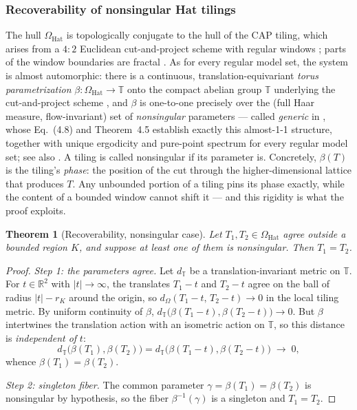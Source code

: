 \documentclass[a4paper,unpublished]{quantumarticle}
\newtheorem{theorem}{Theorem}
\theoremstyle{remark}
\newcommand{\OHat}{\Omega_{\mathrm{Hat}}}
\newcommand{\RR}{\mathbb{R}}
\begin{document}
\subsubsection{Recoverability of nonsingular Hat tilings}

The hull $\OHat$ is topologically conjugate to the hull of the CAP
tiling, which arises from a $4{:}2$ Euclidean cut-and-project scheme
with regular windows \cite{BGS2025}; parts of the window boundaries
are fractal \cite[Fig.~10]{BGMM2025}. As for every regular model
set, the system is almost automorphic: there is a continuous,
translation-equivariant \emph{torus parametrization}
$\beta : \OHat \to \mathbb{T}$ onto the compact abelian group
$\mathbb{T}$ underlying the cut-and-project scheme
\cite[Def.~4.2 and Prop.~4.3]{Schlottmann}, and $\beta$ is
one-to-one precisely over the (full Haar measure, flow-invariant) set
of \emph{nonsingular} parameters --- called \emph{generic} in
\cite{Schlottmann}, whose Eq.~(4.8) and Theorem~4.5 establish
exactly this almost-1-1 structure, together with unique ergodicity
and pure-point spectrum for every regular model set; see also
\cite[Ch.~7]{BaakeGrimm}. A tiling is called nonsingular if its
parameter is. Concretely, $\beta(T)$ is the tiling's
\emph{phase}: the position of the cut through the higher-dimensional
lattice that produces $T$. Any unbounded portion of a tiling pins its
phase exactly, while the content of a bounded window cannot shift it
--- and this rigidity is what the proof exploits.

\begin{theorem}[Recoverability, nonsingular case]
\label{thm:recover}
Let $T_{1}, T_{2} \in \OHat$ agree outside a bounded region $K$, and
suppose at least one of them is nonsingular. Then $T_{1} = T_{2}$.
\end{theorem}

\begin{proof}
\emph{Step 1: the parameters agree.} Let $d_{\mathbb{T}}$ be a
translation-invariant metric on $\mathbb{T}$. For $t \in \RR^{2}$
with $|t| \to \infty$, the translates $T_{1} - t$ and $T_{2} - t$
agree on the ball of radius $|t| - r_{K}$ around the origin, so
$d_{\Omega}(T_{1} - t,\, T_{2} - t) \to 0$ in the local tiling
metric. By uniform continuity of $\beta$,
$d_{\mathbb{T}}\bigl( \beta(T_{1} - t), \beta(T_{2} - t) \bigr) \to
0$. But $\beta$ intertwines the translation action with an isometric
action on $\mathbb{T}$, so this distance is \emph{independent of}
$t$:
\[
d_{\mathbb{T}}\bigl( \beta(T_{1}), \beta(T_{2}) \bigr)
 = d_{\mathbb{T}}\bigl( \beta(T_{1} - t), \beta(T_{2} - t) \bigr)
 \;\longrightarrow\; 0 ,
\]
whence $\beta(T_{1}) = \beta(T_{2})$.

\emph{Step 2: singleton fiber.} The common parameter
$\gamma = \beta(T_{1}) = \beta(T_{2})$ is nonsingular by hypothesis,
so the fiber $\beta^{-1}(\gamma)$ is a singleton and
$T_{1} = T_{2}$.
\end{proof}
\end{document}
